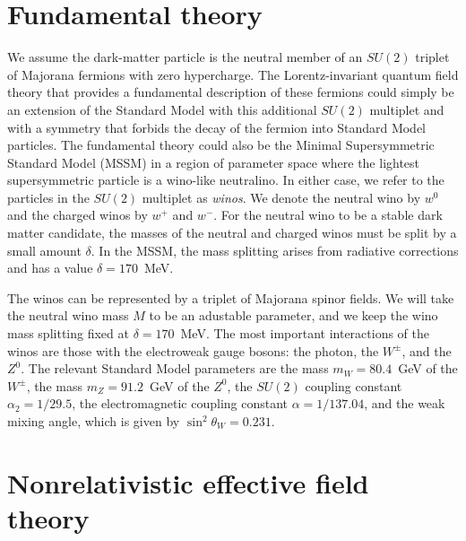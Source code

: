 \documentclass[%
 reprint,
 amsmath,amssymb,
 aps,
]{revtex4-1}
\begin{document}
\section{Fundamental theory}
\label{sec:QFT}

We assume the dark-matter particle is the neutral member of an $SU(2)$ triplet of Majorana fermions with zero hypercharge. 
The Lorentz-invariant quantum field theory that provides a fundamental  description of these fermions could simply be an extension of the Standard Model with this additional $SU(2)$ multiplet and with a symmetry that forbids the decay of the fermion into Standard Model particles. 
The fundamental theory could also be the Minimal Supersymmetric Standard Model (MSSM) in a region of parameter space where the lightest supersymmetric particle is a wino-like neutralino.
In either case, we refer to the particles in the $SU(2)$ multiplet as {\it winos}. 
We denote the neutral wino by $w^0$ and the charged winos by $w^+$ and $w^-$. 
For the neutral wino to be a stable dark matter candidate, the masses of the neutral and charged winos must be split by a small amount $\delta$. 
In the MSSM, the mass splitting arises from radiative corrections and has a value $\delta=170$~MeV.

The winos can be represented by a triplet of Majorana spinor fields.
We will take the neutral wino mass $M$ to be an adustable parameter, and we keep the wino mass splitting fixed at $\delta= 170$~MeV.
The most important interactions of the winos are those with the electroweak gauge bosons: the photon, the $W^\pm$, and the $Z^0$.
The relevant Standard Model parameters are the mass $m_W = 80.4$~GeV of the $W^\pm$, the mass $m_Z = 91.2$~GeV of the $Z^0$, the $SU(2)$ coupling constant $\alpha_2= 1/29.5$, the electromagnetic coupling constant $\alpha = 1/137.04$, and the weak mixing angle, which is given by $\sin^2 \theta_W = 0.231$.


\section{Nonrelativistic  effective field theory}
\label{sec:NREFT}
\end{document}
